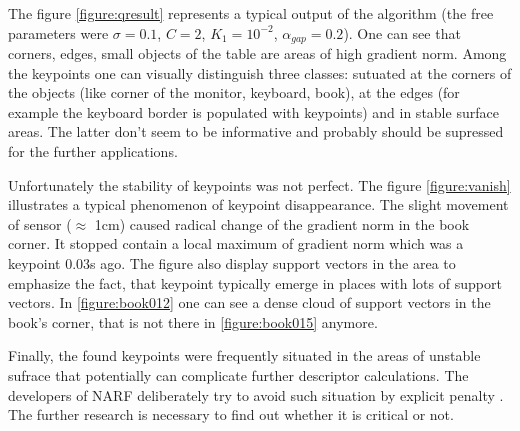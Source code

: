 The figure \ref{figure:qresult} represents a typical output of the algorithm (the free parameters were $\sigma=0.1$, $C=2$, $K_1=10^{-2}$, $\alpha_{gap}=0.2$). One can see that corners, edges, small objects of the table are areas of high gradient norm. Among the keypoints one can visually distinguish three classes: sutuated at the corners of the objects (like corner of the monitor, keyboard, book), at the edges (for example the keyboard border is populated with keypoints) and in stable surface areas. The latter don't seem to be informative and probably should be supressed for the further applications.

Unfortunately the stability of keypoints was not perfect. The figure \ref{figure:vanish} illustrates a typical phenomenon of keypoint disappearance. The slight movement of sensor ($\approx$ 1cm) caused radical change of the gradient norm in the book corner. It stopped contain a local maximum of gradient norm which was a keypoint 0.03s ago. The figure also display support vectors in the area to emphasize the fact, that keypoint typically emerge in places with lots of support vectors. In \ref{figure:book012} one can see a dense cloud of support vectors in the book's corner, that is not there in \ref{figure:book015} anymore.

Finally, the found keypoints were frequently situated in the areas of unstable sufrace that potentially can complicate further descriptor calculations. The developers of NARF deliberately try to avoid such situation by explicit penalty \cite{steder2011point}. The further research is necessary to find out whether it is critical or not.

